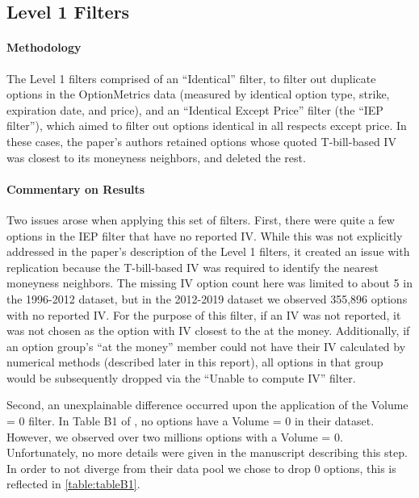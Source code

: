 \subsection{Level 1 Filters} 


\paragraph{Methodology}

The Level 1 filters comprised of an ``Identical'' filter, to filter out duplicate options in the OptionMetrics data (measured by identical option type, strike, expiration date, and price), and an ``Identical Except Price'' filter (the ``IEP filter''), which aimed to filter out options identical in all respects except price. In these cases, the paper's authors retained options whose quoted T-bill-based IV was closest to its moneyness neighbors, and deleted the rest.

\paragraph{Commentary on Results}

Two issues arose when applying this set of filters. First, there were quite a few options in the IEP filter that have no reported IV. While this was not explicitly addressed in the paper's description of the Level 1 filters, it created an issue with replication because the T-bill-based IV was required to identify the nearest moneyness neighbors. The missing IV option count here was limited to about 5 in the 1996-2012 dataset, but in the 2012-2019 dataset we observed 355,896 options with no reported IV. For the purpose of this filter, if an IV was not reported, it was not chosen as the option with IV closest to the at the money. Additionally, if an option group's ``at the money'' member could not have their IV calculated by numerical methods (described later in this report), all options in that group would be subsequently dropped via the ``Unable to compute IV'' filter. 

Second, an unexplainable difference occurred upon the application of the Volume = 0 filter. In Table B1 of \citet{constantinides2013}, no options have a Volume = 0 in their dataset. However, we observed over two millions options with a Volume = 0. Unfortunately, no more details were given in the manuscript describing this step. In order to not diverge from their data pool we chose to drop 0 options, this is reflected in \autoref{table:tableB1}. 

